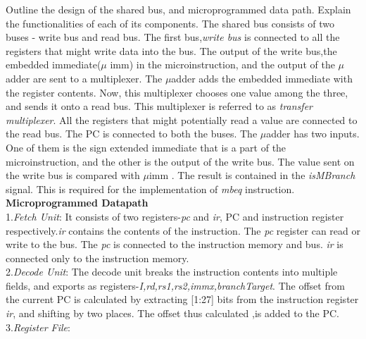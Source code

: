 \begin{ExerciseList}
\Exercise
Outline the design of the shared bus, and microprogrammed data path. Explain the functionalities of each of its
components.
\Answer
The shared bus consists of two buses - write bus and read bus.\newline
The first bus,\textit{write bus} is connected to all the registers that might write data into the bus. The output of the write bus,the embedded immediate($\mu$ imm) in the microinstruction, and the output of the $\mu$adder are sent to a multiplexer. The $\mu$adder adds the embedded immediate with the register contents. Now, this multiplexer chooses one value among the three, and sends it onto a read bus. This multiplexer is referred to as \textit{transfer multiplexer}. All the registers that might potentially read a value are connected to the read bus. The PC is connected to both the buses. The $\mu$adder has two inputs. One of them is the sign extended immediate that is a part of the microinstruction, and the other is the output of the write bus.\newline
The value sent on the write bus is compared with $\mu$imm . The result is contained in the \textit{isMBranch} signal. This is required for the implementation of \textit{mbeq} instruction.
\newline \textbf{Microprogrammed Datapath}\newline \\
1.\hspace{4mm}\textit{Fetch Unit}:\newline 
It consists of two registers-\textit{pc} and \textit{ir}, PC and instruction register respectively.\textit{ir} contains the contents of the instruction. The \textit{pc} register can read or write to the bus. The \textit{pc} is connected to the instruction memory and bus. \textit{ir} is connected only to the instruction memory.\newline \\
2.\hspace{4mm}\textit{Decode Unit}:\newline 
The decode unit breaks the instruction contents into multiple fields, and exports as registers-\textit{I,rd,rs1,rs2,immx,branchTarget}. The offset from the current PC is calculated by extracting [1:27] bits from the instruction register \textit{ir}, and shifting by two places. The offset thus calculated ,is added to the PC.\newline \\
3.\hspace{4mm}\textit{Register File}:\newline 

\end{ExerciseList}
